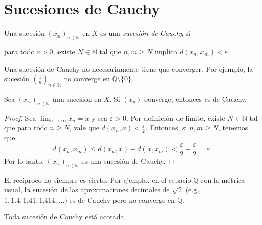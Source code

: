 \section{Sucesiones de Cauchy}

\begin{definition}
	Una sucesión $(x_n)_{n \in \mathbb{N}}$ en $X$ es una \emph{sucesión de Cauchy} si
	\begin{center}
		\begin{minipage}{0.9\linewidth}
			para todo $\varepsilon > 0$, existe $N \in \mathbb{N}$ tal que $n, m \geq N$ implica $d(x_n, x_m) < \varepsilon$.
		\end{minipage}
	\end{center}
\end{definition}

\begin{remark}
	Una sucesión de Cauchy no necesariamente tiene que converger. Por ejemplo, la sucesión $(\frac{1}{n})_{n \in \mathbb{N}}$ no converge en $\mathbb{Q} \setminus \{ 0 \}$.
\end{remark}

\begin{proposition}
	Sea $(x_n)_{n \in \mathbb{N}}$ una sucesión en $X$. Si $(x_n)$ converge, entonces es de Cauchy.
\end{proposition}

\begin{proof}
	Sea $\lim_{n \to \infty} x_n = x$ y sea $\varepsilon > 0$. Por definición de límite, existe $N \in \mathbb{N}$ tal que para todo $n \geq N$, vale que $d(x_n, x) < \frac{\varepsilon}{2}$. Entonces, si $n, m \geq N$, tenemos que
	$$
		d(x_n, x_m) \leq d(x_n, x) + d(x, x_m) < \frac{\varepsilon}{2} + \frac{\varepsilon}{2} = \varepsilon.
	$$
	Por lo tanto, $(x_n)_{n \in \mathbb{N}}$ es una sucesión de Cauchy.
\end{proof}

\begin{remark}
	El recíproco no siempre es cierto. Por ejemplo, en el espacio $\mathbb{Q}$ con la métrica usual, la sucesión de las aproximaciones decimales de $\sqrt{2}$ (e.g., $1, 1.4, 1.41, 1.414, \dots$) es de Cauchy pero no converge en $\mathbb{Q}$.
\end{remark}
\begin{proposition}
	Toda sucesión de Cauchy está acotada.
\end{proposition}

